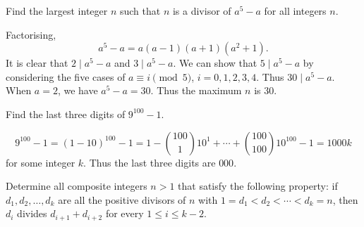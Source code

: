 \begin{solution}

\end{solution}

\begin{prbm}
\end{prbm}

\begin{prbm}
\end{prbm}

\begin{prbm}
\end{prbm}

\begin{prbm}
\end{prbm}

\begin{prbm}
\end{prbm}

\begin{prbm}
Find the largest integer $n$ such that $n$ is a divisor of $a^5-a$ for all integers $n$.
\end{prbm}

\begin{solution}
Factorising,
\[a^5-a=a(a-1)(a+1)(a^2+1).\]
It is clear that $2\mid a^5-a$ and $3\mid a^5-a$. We can show that $5\mid a^5-a$ by considering the five cases of $a\equiv i\pmod5$, $i=0,1,2,3,4$. Thus $30\mid a^5-a$. When $a=2$, we have $a^5-a=30$. Thus the maximum $n$ is $30$.
\end{solution}
\pagebreak

\begin{prbm}
Find the last three digits of $9^{100}-1$.
\end{prbm}

\begin{solution}
\[9^{100}-1=(1-10)^{100}-1=1-\binom{100}{1}10^1+\cdots+\binom{100}{100}10^{100}-1=1000k\]
for some integer $k$. Thus the last three digits are $000$.
\end{solution}

\begin{prbm}
Determine all composite integers $n>1$ that satisfy the following property: if $d_1, d_2, \dots, d_k$ are all the positive divisors of $n$ with $1=d_1<d_2<\cdots<d_k=n$, then $d_i$ divides $d_{i+1}+d_{i+2}$ for every $1\le i \le k-2$.
\end{prbm}

